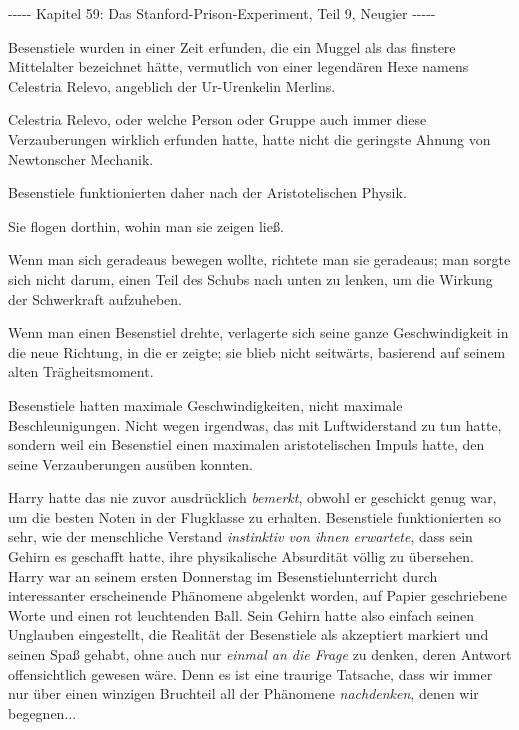 

\hypertarget{das-stanford-prison-experiment-teil-9-neugier}{%

-\/-\/-\/-\/- Kapitel 59: Das Stanford-Prison-Experiment, Teil 9, Neugier -\/-\/-\/-\/-

Besenstiele wurden in einer Zeit erfunden, die ein Muggel als das finstere Mittelalter bezeichnet hätte, vermutlich von einer legendären Hexe namens Celestria Relevo, angeblich der Ur-Urenkelin Merlins.

Celestria Relevo, oder welche Person oder Gruppe auch immer diese Verzauberungen wirklich erfunden hatte, hatte nicht die geringste Ahnung von Newtonscher Mechanik.

Besenstiele funktionierten daher nach der Aristotelischen Physik.

Sie flogen dorthin, wohin man sie zeigen ließ.

Wenn man sich geradeaus bewegen wollte, richtete man sie geradeaus; man sorgte sich nicht darum, einen Teil des Schubs nach unten zu lenken, um die Wirkung der Schwerkraft aufzuheben.

Wenn man einen Besenstiel drehte, verlagerte sich seine ganze Geschwindigkeit in die neue Richtung, in die er zeigte; sie blieb nicht seitwärts, basierend auf seinem alten Trägheitsmoment.

Besenstiele hatten maximale Geschwindigkeiten, nicht maximale Beschleunigungen. Nicht wegen irgendwas, das mit Luftwiderstand zu tun hatte, sondern weil ein Besenstiel einen maximalen aristotelischen Impuls hatte, den seine Verzauberungen ausüben konnten.

Harry hatte das nie zuvor ausdrücklich \emph{bemerkt}, obwohl er geschickt genug war, um die besten Noten in der Flugklasse zu erhalten. Besenstiele funktionierten so sehr, wie der menschliche Verstand \emph{instinktiv von ihnen erwartete}, dass sein Gehirn es geschafft hatte, ihre physikalische Absurdität völlig zu übersehen. Harry war an seinem ersten Donnerstag im Besenstielunterricht durch interessanter erscheinende Phänomene abgelenkt worden, auf Papier geschriebene Worte und einen rot leuchtenden Ball. Sein Gehirn hatte also einfach seinen Unglauben eingestellt, die Realität der Besenstiele als akzeptiert markiert und seinen Spaß gehabt, ohne auch nur \emph{einmal an die Frage} zu denken, deren Antwort offensichtlich gewesen wäre. Denn es ist eine traurige Tatsache, dass wir immer nur über einen winzigen Bruchteil all der Phänomene \emph{nachdenken}, denen wir begegnen...

}
